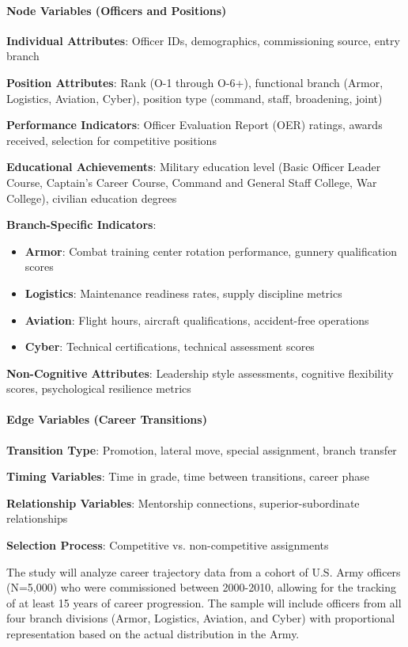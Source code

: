 \documentclass[../main.tex]{subfiles}
\begin{document}
\paragraph{Node Variables (Officers and Positions)}
\textbf{Individual Attributes}: Officer IDs, demographics, commissioning source, entry branch

\textbf{Position Attributes}: Rank (O-1 through O-6+), functional branch (Armor, Logistics, Aviation, Cyber), position type (command, staff, broadening, joint)

\textbf{Performance Indicators}: Officer Evaluation Report (OER) ratings, awards received, selection for competitive positions

\textbf{Educational Achievements}: Military education level (Basic Officer Leader Course, Captain's Career Course, Command and General Staff College, War College), civilian education degrees

\textbf{Branch-Specific Indicators}:
\begin{itemize}
\item \textbf{Armor}: Combat training center rotation performance, gunnery qualification scores
\item \textbf{Logistics}: Maintenance readiness rates, supply discipline metrics
\item \textbf{Aviation}: Flight hours, aircraft qualifications, accident-free operations
\item \textbf{Cyber}: Technical certifications, technical assessment scores
\end{itemize}

\textbf{Non-Cognitive Attributes}: Leadership style assessments, cognitive flexibility scores, psychological resilience metrics

\paragraph{Edge Variables (Career Transitions)}
\textbf{Transition Type}: Promotion, lateral move, special assignment, branch transfer

\textbf{Timing Variables}: Time in grade, time between transitions, career phase

\textbf{Relationship Variables}: Mentorship connections, superior-subordinate relationships

\textbf{Selection Process}: Competitive vs. non-competitive assignments


The study will analyze career trajectory data from a cohort of U.S. Army officers (N=5,000) who were commissioned between 2000-2010, allowing for the tracking of at least 15 years of career progression. The sample will include officers from all four branch divisions (Armor, Logistics, Aviation, and Cyber) with proportional representation based on the actual distribution in the Army.
\end{document}
